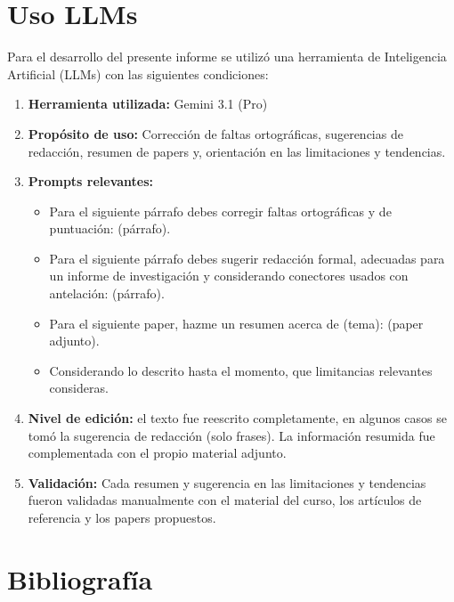\documentclass[letter, 10pt]{article}
\begin{document}
\section{Uso LLMs}

Para el desarrollo del presente informe se utilizó una herramienta de Inteligencia Artificial (LLMs) con las siguientes condiciones:

\begin{enumerate}
    \item \textbf{Herramienta utilizada:} Gemini 3.1 (Pro)
    \item \textbf{Propósito de uso:} Corrección de faltas ortográficas, sugerencias de redacción, resumen de papers y, orientación en las limitaciones y tendencias.
    \item \textbf{Prompts relevantes:}
    \begin{itemize}
        \item Para el siguiente párrafo debes corregir faltas ortográficas y de puntuación: (párrafo).
        \item Para el siguiente párrafo debes sugerir redacción formal, adecuadas para un informe de investigación y considerando conectores usados con antelación: (párrafo).
        \item Para el siguiente paper, hazme un resumen acerca de (tema): (paper adjunto).
        \item Considerando lo descrito hasta el momento, que limitancias relevantes consideras.
    \end{itemize}
    \item \textbf{Nivel de edición:} el texto fue reescrito completamente, en algunos casos se tomó la sugerencia de redacción (solo frases). La información resumida fue complementada con el propio material adjunto.
    \item \textbf{Validación:} Cada resumen y sugerencia en las limitaciones y tendencias fueron validadas manualmente con el material del curso, los artículos de referencia y los papers propuestos.
\end{enumerate}

\section{Bibliografía}



\end{document}
